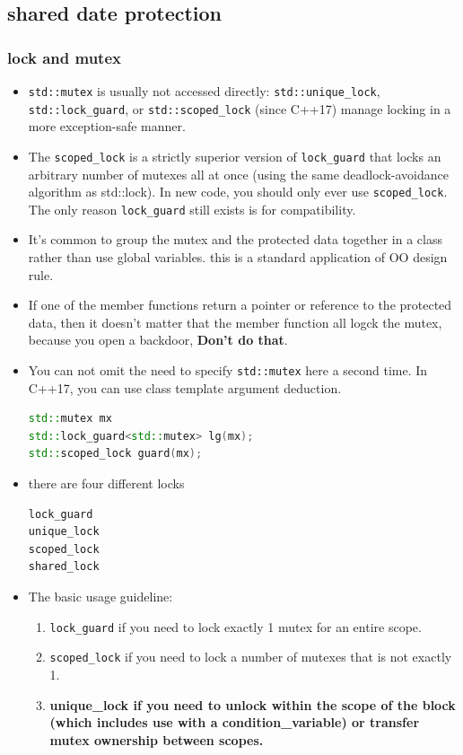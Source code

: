 \documentclass[a4paper,11pt,twoside]{book}
\begin{document}
\subsection{shared date protection}
\subsubsection{lock and mutex}

\begin{itemize}
	\item \texttt{std::mutex} is usually not accessed directly: \texttt{std::unique\_lock}, \texttt{std::lock\_guard}, or \texttt{std::scoped\_lock} (since C++17) manage locking in a more exception-safe manner.
	
	\item The \texttt{scoped\_lock} is a strictly superior version of \texttt{lock\_guard} that locks an arbitrary number of mutexes all at once (using the same deadlock-avoidance algorithm as std::lock). In new code, you should only ever use \texttt{scoped\_lock}. The only reason \texttt{lock\_guard} still exists is for compatibility. 
	
	\item It's common to group the mutex and the protected data together in a class rather than use global variables. this is a standard application of OO design rule.
	
	\item If one of the member functions return a pointer or reference to the protected data, then it doesn't matter that the member function all logck the mutex, because you open a backdoor, \textbf{Don't do that}. 
	
	\item You can not omit the need to specify \texttt{std::mutex} here a second time. In C++17, you can use class template argument deduction. 
	
\begin{lstlisting}[frame=single, language=c++]
std::mutex mx
std::lock_guard<std::mutex> lg(mx);
std::scoped_lock guard(mx);
\end{lstlisting}

	\item there are four different locks
\begin{lstlisting}[frame=single, language=c++]	
lock_guard
unique_lock
scoped_lock
shared_lock	
\end{lstlisting}

	\item The basic usage guideline:
\begin{enumerate}
	\item \texttt{lock\_guard} if you need to lock exactly 1 mutex for an entire scope.
	\item \texttt{scoped\_lock} if you need to lock a number of mutexes that is not exactly 1.
	\item \textbf{unique\_lock if you need to unlock within the scope of the block (which includes use with a condition\_variable) or transfer mutex ownership between scopes.}
\end{enumerate}


\end{itemize}
\end{document}
